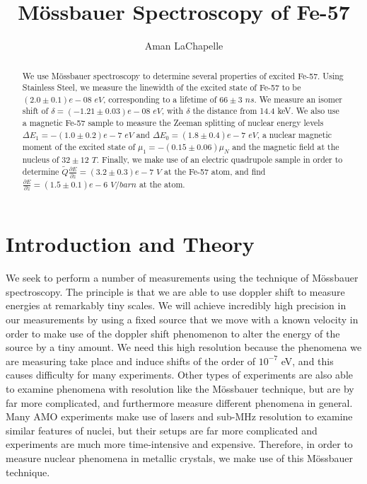 \documentclass[reprint, nobibnotes, amssymb, amsmath, amsfonts, mathtools, mathrsfs, floatfix]{revtex4-1}
\newcommand{\moss}{M\"{o}ssbauer }
\begin{document}
  \title{\moss Spectroscopy of Fe-57}

  \author{Aman LaChapelle}

  \begin{abstract}
    We use \moss spectroscopy to determine several properties of excited Fe-57.  Using Stainless Steel, we measure the linewidth of the excited state of Fe-57 to be $(2.0\pm0.1)e-08\,\, eV$, corresponding to a lifetime of $66 \pm 3\,\, ns$.  We measure an isomer shift of $\delta = (-1.21\pm0.03)e-08\,\, eV$, with $\delta$ the distance from 14.4 keV.  We also use a magnetic Fe-57 sample to measure the Zeeman splitting of nuclear energy levels $\Delta E_1 = -(1.0\pm0.2)e-7\,\, eV$ and $\Delta E_0 = (1.8\pm0.4)e-7\,\, eV$, a nuclear magnetic moment of the excited state of $\mu_1 = -(0.15\pm0.06)\mu_N$ and the magnetic field at the nucleus of $32\pm12\,\, T$.  Finally, we make use of an electric quadrupole sample in order to determine $\tilde{Q}\frac{\partial E}{\partial z} = (3.2\pm0.3)e-7 \,\, V$ at the Fe-57 atom, and find $\frac{\partial E}{\partial z} = (1.5\pm0.1)e-6\,\, V/barn$ at the atom.
  \end{abstract}

  \maketitle
  \tableofcontents

  \section{Introduction and Theory}
    We seek to perform a number of measurements using the technique of \moss spectroscopy.  The principle is that we are able to use doppler shift to measure energies at remarkably tiny scales.  We will achieve incredibly high precision in our measurements by using a fixed source that we move with a known velocity in order to make use of the doppler shift phenomenon to alter the energy of the source by a tiny amount.  We need this high resolution because the phenomena we are measuring take place and induce shifts of the order of $10^{-7}$ eV, and this causes difficulty for many experiments.  Other types of experiments are also able to examine phenomena with resolution like the \moss technique, but are by far more complicated, and furthermore measure different phenomena in general.  Many AMO experiments make use of lasers and sub-MHz resolution to examine similar features of nuclei, but their setups are far more complicated and experiments are much more time-intensive and expensive.  Therefore, in order to measure nuclear phenomena in metallic crystals, we make use of this \moss technique.
\end{document}
